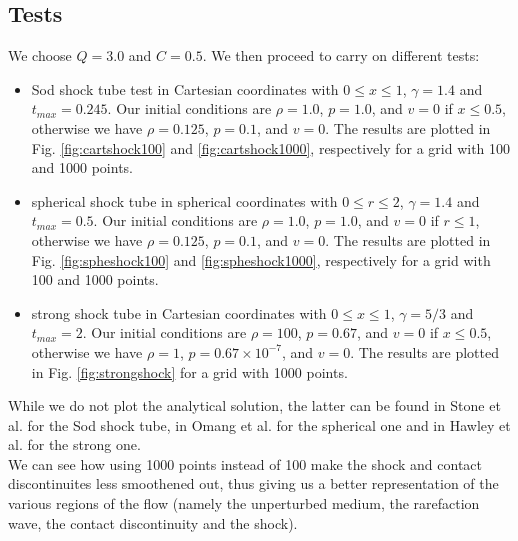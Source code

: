 \documentclass{article}
\begin{document}
\subsection{Tests}
We choose $Q=3.0$ and $C=0.5$. We then proceed to carry on different tests:
\begin{itemize}
	\item Sod shock tube test in Cartesian coordinates with $0\le x \le 1$, $\gamma=1.4$ and $t_{max}=0.245$. Our initial conditions are $\rho=1.0$, $p=1.0$, and $v=0$ if $x\le 0.5$, otherwise we have $\rho=0.125$, $p=0.1$, and $v=0$. The results are plotted in Fig. \ref{fig:cartshock100} and \ref{fig:cartshock1000}, respectively for a grid with 100 and 1000 points.
	\item spherical shock tube in spherical coordinates with $0\le r \le 2$, $\gamma=1.4$ and $t_{max}=0.5$. Our initial conditions are $\rho=1.0$, $p=1.0$, and $v=0$ if $r\le 1$, otherwise we have $\rho=0.125$, $p=0.1$, and $v=0$. The results are plotted in Fig. \ref{fig:spheshock100} and \ref{fig:spheshock1000}, respectively for a grid with 100 and 1000 points.
	\item strong shock tube in Cartesian coordinates with $0\le x \le 1$, $\gamma=5/3$ and $t_{max}=2$. Our initial conditions are $\rho=100$, $p=0.67$, and $v=0$ if $x\le 0.5$, otherwise we have $\rho=1$, $p=0.67\times 10^{-7}$, and $v=0$. The results are plotted in Fig. \ref{fig:strongshock} for a grid with 1000 points.
\end{itemize}
While we do not plot the analytical solution, the latter can be found in Stone et al.\cite{stone} for the Sod shock tube, in Omang et al.\cite{omang} for the spherical one and in Hawley et al.\cite{hawley} for the strong one. \\
We can see how using 1000 points instead of 100 make the shock and contact discontinuites less smoothened out, thus giving us a better representation of the various regions of the flow (namely the unperturbed medium, the rarefaction wave, the contact discontinuity and the shock).
\end{document}
